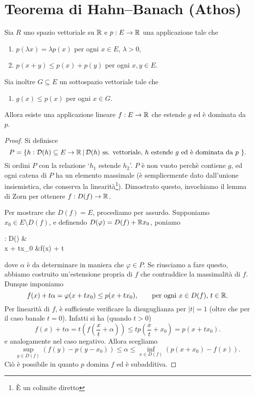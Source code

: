 \section{Teorema di Hahn--Banach (Athos)}
\begin{theorem}
\label{th:hahn_banach}
	Sia $R$ uno spazio vettoriale su $\mathbb{R}$ e $p : E \to \mathbb{R}$ una applicazione tale che
	\begin{enumerate}
		\item $p(\lambda x) = \lambda p(x)$ per ogni $x \in E$, $\lambda > 0$,
		\item $p(x+y) \leq p(x) + p(y)$ per ogni $x,y \in E$.
	\end{enumerate}
	Sia inoltre $G \subseteq E$ un sottospazio vettoriale tale che
	\begin{enumerate}[resume]
		\item $g(x) \leq p(x)$ per ogni $x \in G$.
	\end{enumerate}
	Allora esiste una applicazione lineare $f : E \to \mathbb{R}$ che estende $g$ ed è dominata da $p$.
\end{theorem}
\begin{proof}
	Si definisce
	\begin{equation*}
		P = \{ h : \mathcal D(h) \subseteq E \to \mathbb{R} \,|\, \text{$\mathcal D(h)$ ss. vettoriale, $h$ estende $g$ ed è dominata da $p$ } \}.
	\end{equation*}
	Si ordini $P$ con la relazione `$h_1$ estende $h_2$'. $P$ è non vuoto perchè contiene $g$, ed ogni catena di $P$ ha un elemento massimale (è semplicemente dato dall'unione insiemistica, che conserva la linearità\footnote{È un colimite diretto}). Dimostrato questo, invochiamo il lemma di Zorn per ottenere $f : D(f) \to \mathbb{R}$.

	Per mostrare che $D(f) = E$, procediamo per assurdo.
	Supponiamo $x_0 \in E \setminus D(f)$, e definendo $D(\varphi) = D(f) + \mathbb{R} x_0$, poniamo
	\begin{eqalign*}
		\varphi : D(\varphi) &\longto \R\\
				x + tx_0 &\longmapsto f(x) + t \alpha
	\end{eqalign*}
	dove $\alpha$ è da determinare in maniera che $\varphi \in P$. Se riusciamo a fare questo, abbiamo costruito un'estensione propria di $f$ che contraddice la massimalità di $f$.
	Dunque imponiamo
	\begin{equation*}
		f(x) + t\alpha = \varphi(x+tx_0) \leq p(x+tx_0), \qquad \text{per ogni $x \in D(f)$, $t \in \mathbb{R}$}.
	\end{equation*}
	Per linearità di $f$, è sufficiente verificare la disuguglianza per $|t|=1$ (oltre che per il caso banale $t=0$). Infatti si ha (quando $t > 0$)
	\begin{equation*}
		f(x) + t\alpha = t\left(f\left(\frac{x}{t} + \alpha\right)\right) \leq t p\left(\frac{x}{t} + x_0\right) = p(x + tx_0).
	\end{equation*}
	e analogamente nel caso negativo. Allora scegliamo
	\begin{equation*}
		\sup_{y \in D(f)} (f(y) - p(y-x_0)) \leq \alpha \leq \inf_{x \in D(f)} (p(x+x_0) - f(x)).
	\end{equation*}
	Ciò è possibile in quanto $p$ domina $f$ ed è subadditiva.
\end{proof}

